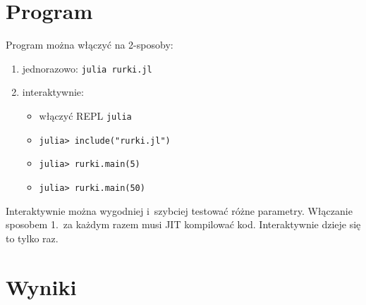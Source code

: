 \documentclass[12pt,a4paper]{mwart}
\begin{document}
\section{Program}
Program można włączyć na 2-sposoby:
\begin{enumerate}
    \item jednorazowo: \verb|julia rurki.jl|
    \item interaktywnie:
    \begin{itemize}
        \item włączyć REPL \verb|julia|
        \item \verb|julia> include("rurki.jl")|
        \item \verb|julia> rurki.main(5)|
        \item \verb|julia> rurki.main(50)|
    \end{itemize}
\end{enumerate}
Interaktywnie można wygodniej i~szybciej
testować różne parametry.
Włączanie sposobem 1.~za każdym razem
musi JIT kompilować kod. Interaktywnie
dzieje się to tylko raz.

\section{Wyniki}
\end{document}
